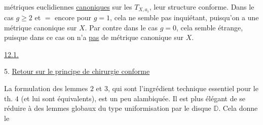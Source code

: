 métriques euclidiennes \uline{canoniques} sur
les $T_{X,a_i}$,  leur structure
conforme. Dans le cas $g\geq2$ et $=$
encore pour $g=1$, cela ne semble pas
inquiétant, puisqu'on a une
métrique canonique sur $X$. Par
contre dans le cas $g=0$, cela semble
étrange, puisque dans ce cas on n'a
\uline{pas} de métrique canonique sur $X$.

\uline{12.1.}

5. \uline{Retour sur le principe de chirurgie conforme}

La formulation des lemmes  $2$ et $3$, qui
sont l'ingrédient technique essentiel pour le
th. $4$ (et lui sont équivalents), est un peu
alambiquée. Il est plus élégant de se
réduire à des lemmes globaux du type
uniformisation par le disque $\mathbb D$. Cela
donne le
